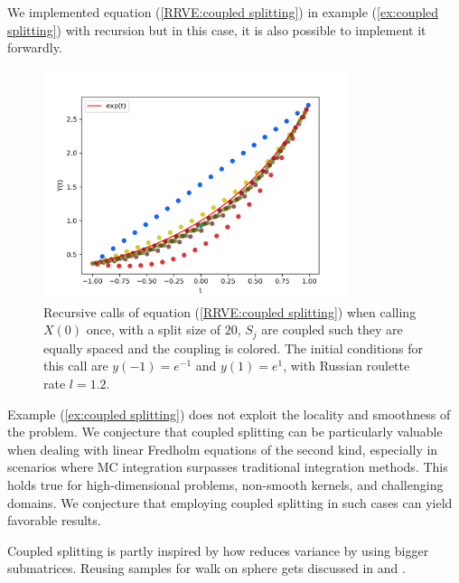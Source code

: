 \begin{pythonn} \label{py:coupled splitting}
    We implemented equation (\ref{RRVE:coupled splitting}) in example
    (\ref{ex:coupled splitting}) with recursion but in this case, it
    is also possible to implement it forwardly. \\

    \begin{figure}[h!]
        \centering
        \includegraphics[width=0.8\textwidth]{plots/coupled split.png}
        \caption{Recursive calls of equation (\ref{RRVE:coupled splitting}) when
        calling $X(0)$ once,
        with a split size of $20$, $S_{j}$ are coupled such
        they are equally spaced and the coupling is colored.
        The initial conditions for this call are $y(-1)=e^{-1}$ and $y(1)=e^{1}$,
        with Russian roulette rate $l=1.2$.  }
        \label{fig:coupled splitting}
    \end{figure}
\end{pythonn}


Example (\ref{ex:coupled splitting}) does not
exploit the locality and smoothness of the problem.
We conjecture that coupled splitting can be particularly valuable when
dealing with linear Fredholm equations of the second kind,
especially in scenarios where MC integration surpasses
traditional integration methods. This holds true for
high-dimensional problems, non-smooth kernels, and
challenging domains. We conjecture that employing
coupled splitting in such cases can yield favorable results.

\begin{related}
    Coupled splitting is partly inspired by how \cite{sabelfeld_sparsified_2009}
    reduces variance by using bigger submatrices.
    Reusing samples for walk on sphere gets discussed
    in \cite{miller_boundary_2023} and \cite{bakbouk_mean_2023}.
\end{related}

